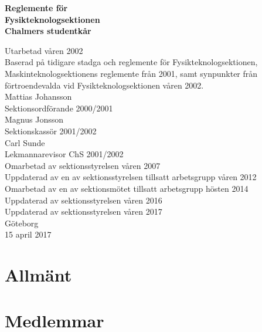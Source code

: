 \documentclass[11pt,a4paper]{article}
\begin{document}

\setlength{\headheight}{14pt}

  \begin{center}
    \textbf{\Huge{Reglemente för}}\\[3mm]
    \textbf{\Huge{Fysikteknologsektionen}}\\
    \vspace{.7 cm}
    \textbf{\Large{Chalmers studentkår}}
    
    
    \vfill
    
    Utarbetad våren 2002\\[5mm]
    Baserad på tidigare stadga och reglemente för Fysikteknologsektionen,
    Maskinteknologsektionens reglemente från 2001, samt synpunkter
    från förtroendevalda vid Fysikteknologsektionen våren 2002.\\[5mm]
    Mattias Johansson\\
    Sektionsordförande 2000/2001\\[5mm]
    Magnus Jonsson\\
    Sektionskassör 2001/2002\\[5mm]
    Carl Sunde\\
    Lekmannarevisor ChS 2001/2002\\[5mm]
    Omarbetad av sektionsstyrelsen våren 2007\\[5mm]
    Uppdaterad av en av sektionsstyrelsen tillsatt arbetsgrupp våren 2012\\[5mm]
    Omarbetad av en av sektionsmötet tillsatt arbetsgrupp hösten 2014 \\[5mm]
    Uppdaterad av sektionsstyrelsen våren 2016 \\[5mm]
    Uppdaterad av sektionsstyrelsen våren 2017 \\[5mm]
    \vspace{.3 cm}
    \small{Göteborg}\\
    \small{15 april 2017}
  \end{center}

\clearpage


\tableofcontents

\clearpage


\section{Allmänt}

\section{Medlemmar}
\end{document}
